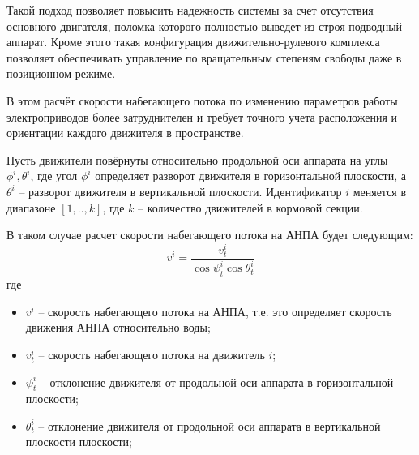 Такой подход позволяет повысить надежность системы за счет отсутствия основного двигателя, поломка которого полностью выведет из строя подводный аппарат.
Кроме этого такая конфигурация движительно-рулевого комплекса позволяет обеспечивать управление по вращательным степеням свободы даже в позиционном режиме.

В этом расчёт скорости набегающего потока по изменению параметров работы электроприводов более затруднителен и требует точного учета расположения и ориентации каждого движителя в пространстве.

Пусть движители повёрнуты относительно продольной оси аппарата на углы $\phi^i, \theta^i$, где угол $\phi^i$ определяет разворот движителя в горизонтальной плоскости, а $\theta^i$ -- разворот движителя в вертикальной плоскости.
Идентификатор $i$ меняется в диапазоне $[1,..,k]$, где $k$ -- количество движителей в кормовой секции.

В таком случае расчет скорости набегающего потока на АНПА будет следующим:
\begin{equation}
    \label{eq:velocity_orientation}
    v^i = \frac{v^i_t}{\cos{\psi^i_t}\cos{\theta^i_t}}
\end{equation}
\noindent где
\begin{itemize}
    \item $v^i$ -- скорость набегающего потока на АНПА, т.е. это определяет скорость движения АНПА относительно воды;
    \item $v^i_t$ -- скорость набегающего потока на движитель $i$;
    \item $\psi^i_t$ -- отклонение движителя от продольной оси аппарата в горизонтальной плоскости;
    \item $\theta^i_t$ -- отклонение движителя от продольной оси аппарата в вертикальной плоскости плоскости;
\end{itemize}



